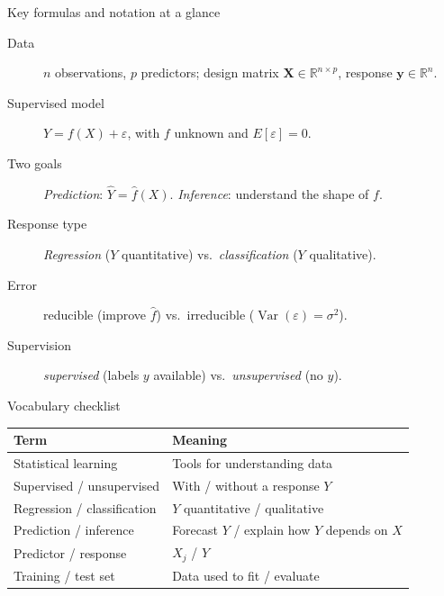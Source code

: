 \documentclass[aspectratio=169,11pt]{beamer}
\begin{document}
\begin{frame}{Key formulas and notation at a glance}
  \footnotesize
  \begin{description}
    \item[Data] $n$ observations, $p$ predictors; design matrix $\mathbf{X}\in\mathbb{R}^{n\times p}$, response $\mathbf{y}\in\mathbb{R}^n$.
    \item[Supervised model] $Y=f(X)+\varepsilon$, with $f$ unknown and $E[\varepsilon]=0$.
    \item[Two goals] \emph{Prediction}: $\hat Y=\hat f(X)$. \quad \emph{Inference}: understand the shape of $f$.
    \item[Response type] \emph{Regression} ($Y$ quantitative) vs.\ \emph{classification} ($Y$ qualitative).
    \item[Error] reducible (improve $\hat f$) vs.\ irreducible ($\operatorname{Var}(\varepsilon)=\sigma^2$).
    \item[Supervision] \emph{supervised} (labels $y$ available) vs.\ \emph{unsupervised} (no $y$).
  \end{description}
\end{frame}

\begin{frame}{Vocabulary checklist}
  \footnotesize
  \begin{tabular}{ll}
    \toprule
    \textbf{Term} & \textbf{Meaning} \\
    \midrule
    Statistical learning & Tools for understanding data \\
    Supervised / unsupervised & With / without a response $Y$ \\
    Regression / classification & $Y$ quantitative / qualitative \\
    Prediction / inference & Forecast $Y$ / explain how $Y$ depends on $X$ \\
    Predictor / response & $X_j$ / $Y$ \\
    Training / test set & Data used to fit / evaluate \\
    \bottomrule
  \end{tabular}
\end{frame}
\end{document}
